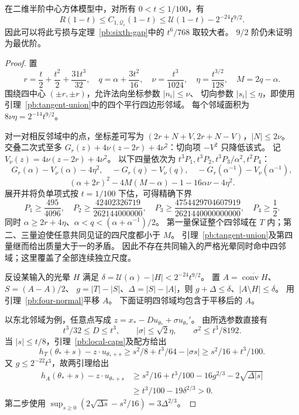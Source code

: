 \begin{theorem}\label{pb:parabolic-gap}
在二维半阶中心方体模型中，对所有 $0<t\le1/100$，有
\[
 R(1-t)\le C_{1,\mathcal Q_c}(1-t)
 \le\mathcal U(1-t)-2^{-24}t^{9/2}.
\]
因此可以将此亏损与定理~\ref{pb:sixth-gap}中的 $t^6/768$ 取较大者。
$9/2$ 阶仍未证明为最优阶。
\end{theorem}
\begin{proof}
置
\[
 r=\frac t2+\frac{t^2}2+\frac{31t^3}{32},\quad
 q=\alpha+\frac{3t^2}{16},\quad\nu=\frac{t^3}{1024},\quad
 \eta=\frac{t^{3/2}}{128},\quad M=2q-\alpha.
\]
围绕四中心 $(\pm r,\pm r)$，允许法向坐标参数 $|n_i|\le\nu$、
切向参数 $|s_i|\le\eta$，即使用引理~\ref{pb:tangent-union}中的四个平行四边形邻域。
每个邻域面积为 $8\nu\eta=2^{-14}t^{9/2}$。

对一对相反邻域中的点，坐标差可写为
$(2r+N+V,2r+N-V)$，$|N|\le2\nu$。
交叠二次式至多
$G_r(z)+4\nu(z-2r)+4\nu^2$：切向项 $-V^2$ 只降低该式。
记 $V_\nu(z)=4\nu(z-2r)+4\nu^2$。
以下四量依次为 $t^3P_1,t^3P_2,t^3P_3/\alpha^2,t^2P_4$：
\[
 G_r(\alpha)-V_\nu(\alpha)-4\eta^2,\quad
 -G_r(q)-V_\nu(q),\quad-G_r(\alpha^{-1})-V_\nu(\alpha^{-1}),
\]
\[
 (\alpha+2r)^2-4M(M-\alpha)-1-16\alpha\nu-4\eta^2.
\]
展开并将负单项式按 $t=1/100$ 下估，可得精确下界
\[
 P_1\ge\frac{495}{4096},\quad
 P_2\ge\frac{42402326719}{262144000000},\quad
 P_3\ge\frac{4754429704607919}{2621440000000000},\quad P_4\ge\frac12.
\]
同时 $\alpha\ge2r+4\eta$、$\alpha<q<(\alpha+\alpha^{-1})/2$。
第一量保证整个四邻域在 $T$ 内；第二、三量迫使任意共同见证的四尺度都小于 $M$。
引理~\ref{pb:tangent-union}及第四量继而给出质量大于一的矛盾。
因此不存在共同输入的严格光晕同时命中四邻域；这里覆盖了全部连续独立尺度。

反设某输入的光晕 $H$ 满足 $\delta=\mathcal U(\alpha)-|H|<2^{-24}t^{9/2}$。
置 $A=\overline{\operatorname{conv}H}$、$S=(A-A)/2$、
$g=|T|-|S|$、$\Delta=|S|-|A|$，则
$g+\Delta\le\delta$、$|A\setminus H|\le\delta$。
用引理~\ref{pb:four-normal}平移 $A$。
下面证明四邻域均包含于平移后的 $A$。

以东北邻域为例，任意点写成
$z=x_*-D u_{\theta_*}+\sigma u_{\theta_*}'$。
由所选参数直接有
\[
 t^3/32\le D\le t^3,\qquad |\sigma|\le\sqrt2\eta,\qquad\sigma^2\le t^3/8192.
\]
当 $|s|\le t/8$，引理~\ref{pb:local-caps}及配方给出
\[
 h_T(\theta_*+s)-z\cdot u_{\theta_*+s}
 \ge s^2/8+t^3/64-|\sigma s|
 \ge s^2/16+t^3/100.
\]
又 $g\le2^{-22}t^3$，故两引理给出
\begin{align*}
 h_A(\theta_*+s)-z\cdot u_{\theta_*+s}
 &\ge s^2/16+t^3/100-16g^{2/3}-2\sqrt{\Delta|s|}\\
 &\ge t^3/100-19\delta^{2/3}>0.
\end{align*}
第二步使用
$\sup_{s\ge0}(2\sqrt{\Delta s}-s^2/16)=3\Delta^{2/3}$。


\end{proof}

